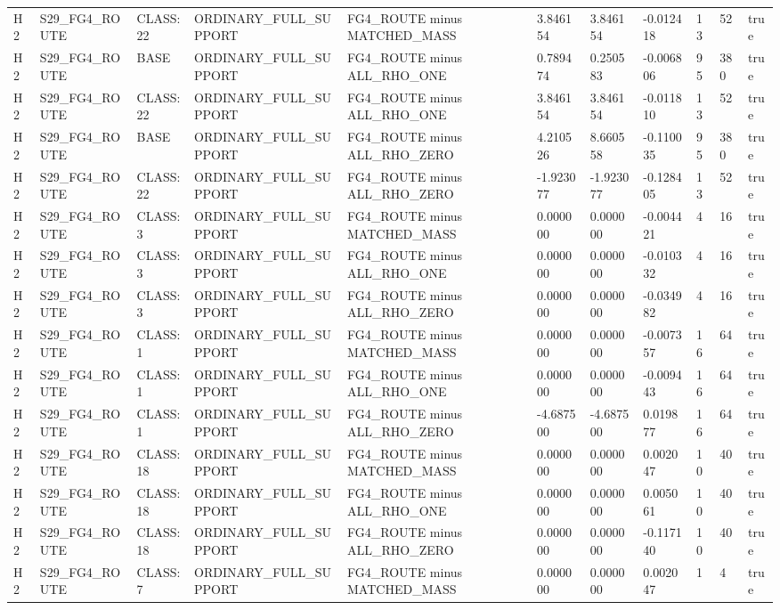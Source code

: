 \begin{tabular}{lllllllllll}
H2 & S29\_FG4\_ROUTE & CLASS:22 & ORDINARY\_FULL\_SUPPORT & FG4\_ROUTE minus MATCHED\_MASS & 3.846154 & 3.846154 & -0.012418 & 13 & 52 & true \\
H2 & S29\_FG4\_ROUTE & BASE & ORDINARY\_FULL\_SUPPORT & FG4\_ROUTE minus ALL\_RHO\_ONE & 0.789474 & 0.250583 & -0.006806 & 95 & 380 & true \\
H2 & S29\_FG4\_ROUTE & CLASS:22 & ORDINARY\_FULL\_SUPPORT & FG4\_ROUTE minus ALL\_RHO\_ONE & 3.846154 & 3.846154 & -0.011810 & 13 & 52 & true \\
H2 & S29\_FG4\_ROUTE & BASE & ORDINARY\_FULL\_SUPPORT & FG4\_ROUTE minus ALL\_RHO\_ZERO & 4.210526 & 8.660558 & -0.110035 & 95 & 380 & true \\
H2 & S29\_FG4\_ROUTE & CLASS:22 & ORDINARY\_FULL\_SUPPORT & FG4\_ROUTE minus ALL\_RHO\_ZERO & -1.923077 & -1.923077 & -0.128405 & 13 & 52 & true \\
H2 & S29\_FG4\_ROUTE & CLASS:3 & ORDINARY\_FULL\_SUPPORT & FG4\_ROUTE minus MATCHED\_MASS & 0.000000 & 0.000000 & -0.004421 & 4 & 16 & true \\
H2 & S29\_FG4\_ROUTE & CLASS:3 & ORDINARY\_FULL\_SUPPORT & FG4\_ROUTE minus ALL\_RHO\_ONE & 0.000000 & 0.000000 & -0.010332 & 4 & 16 & true \\
H2 & S29\_FG4\_ROUTE & CLASS:3 & ORDINARY\_FULL\_SUPPORT & FG4\_ROUTE minus ALL\_RHO\_ZERO & 0.000000 & 0.000000 & -0.034982 & 4 & 16 & true \\
H2 & S29\_FG4\_ROUTE & CLASS:1 & ORDINARY\_FULL\_SUPPORT & FG4\_ROUTE minus MATCHED\_MASS & 0.000000 & 0.000000 & -0.007357 & 16 & 64 & true \\
H2 & S29\_FG4\_ROUTE & CLASS:1 & ORDINARY\_FULL\_SUPPORT & FG4\_ROUTE minus ALL\_RHO\_ONE & 0.000000 & 0.000000 & -0.009443 & 16 & 64 & true \\
H2 & S29\_FG4\_ROUTE & CLASS:1 & ORDINARY\_FULL\_SUPPORT & FG4\_ROUTE minus ALL\_RHO\_ZERO & -4.687500 & -4.687500 & 0.019877 & 16 & 64 & true \\
H2 & S29\_FG4\_ROUTE & CLASS:18 & ORDINARY\_FULL\_SUPPORT & FG4\_ROUTE minus MATCHED\_MASS & 0.000000 & 0.000000 & 0.002047 & 10 & 40 & true \\
H2 & S29\_FG4\_ROUTE & CLASS:18 & ORDINARY\_FULL\_SUPPORT & FG4\_ROUTE minus ALL\_RHO\_ONE & 0.000000 & 0.000000 & 0.005061 & 10 & 40 & true \\
H2 & S29\_FG4\_ROUTE & CLASS:18 & ORDINARY\_FULL\_SUPPORT & FG4\_ROUTE minus ALL\_RHO\_ZERO & 0.000000 & 0.000000 & -0.117140 & 10 & 40 & true \\
H2 & S29\_FG4\_ROUTE & CLASS:7 & ORDINARY\_FULL\_SUPPORT & FG4\_ROUTE minus MATCHED\_MASS & 0.000000 & 0.000000 & 0.002047 & 1 & 4 & true \\

\end{tabular}
